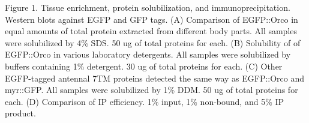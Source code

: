 Figure 1. Tissue enrichment, protein solubilization, and immunoprecipitation. Western blots against EGFP and GFP tags. (A) Comparison of EGFP::Orco in equal amounts of total protein extracted from different body parts. All samples were solubilized by 4\% SDS. 50 ug of total proteins for each. (B) Solubility of of EGFP::Orco in various laboratory detergents. All samples were solubilized by buffers containing 1\% detergent. 30 ug of total proteins for each. (C) Other EGFP-tagged antennal 7TM proteins detected the same way as EGFP::Orco and myr::GFP. All samples were solubilized by 1\% DDM. 50 ug of total proteins for each. (D) Comparison of IP efficiency. 1\% input, 1\% non-bound, and 5\% IP product.